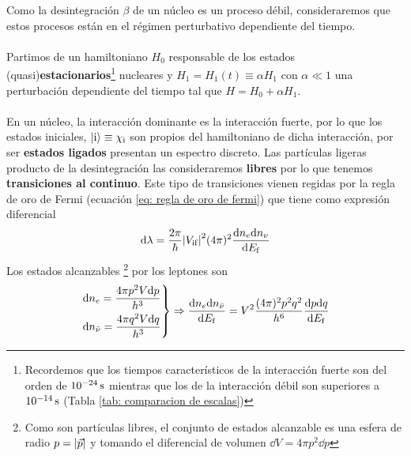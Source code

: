 Como la desintegración $\beta$ de un núcleo es un proceso débil, consideraremos que estos procesos están en el régimen perturbativo dependiente del tiempo.\\\\
Partimos de un hamiltoniano $H_0$ responsable de los estados (quasi)\textbf{estacionarios}\footnote{Recordemos que los tiempos característicos de la interacción fuerte son del orden de $\unit[10^{-24}]{s}$ mientras que los de la interacción débil son superiores a $\unit[10^{-14}]{s}$ (Tabla \ref{tab: comparacion de escalas}) } nucleares y $H_1 =H_1(t)\equiv \alpha H_1$ con $\alpha \ll 1$ una perturbación dependiente del tiempo tal que $H=H_0+\alpha H_1$. \\\\ En un núcleo, la interacción dominante es la interacción fuerte, por lo que los estados iniciales, $\ket{\mathrm{i}}\equiv \chi_\mathrm{i}$ son propios del hamiltoniano de dicha interacción, por ser \textbf{estados ligados} presentan un espectro discreto. Las partículas ligeras producto de la desintegración las consideraremos \textbf{libres} por lo que tenemos \textbf{transiciones al continuo}.  Este tipo de transiciones vienen regidas por la regla de oro de Fermi (ecuación \ref{eq: regla de oro de fermi}) que tiene como expresión diferencial
\begin{equation*}
   \dd \lambda=\frac{2\pi}{\hbar} \abs{V_\mathrm{if}}^2 (4\pi)^2 \frac{\dd n_e \dd n_\nu}{\dd E_\mathrm{f}}
\end{equation*}
Los estados alcanzables \footnote{Como son partículas libres, el conjunto de estados alcanzable es una esfera de radio $p=\abs{\vec{p}}$ y tomando el diferencial de volumen $\dd V=4\pi p^2 \dd p$} por los leptones son
\begin{equation*}
    \left.\begin{aligned}
        &\dd n_e =\frac{4\pi p^2V\dd p}{h^3}\\
        &\dd n_{\Bar{\nu}} =\frac{4\pi q^2V\dd q}{h^3}
    \end{aligned} \right\} \Rightarrow \frac{\dd n_e \dd n_{\Bar{\nu}}}{\dd E_\mathrm{f}} = V^2 \frac{(4\pi)^2 p^2 q^2}{h^6} \frac{\dd p \dd q}{\dd E_\mathrm{f}}
\end{equation*}

